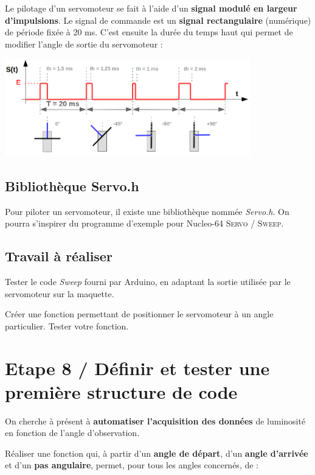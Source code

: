 \documentclass[a4paper,11pt,titlepage]{article} %
\begin{document}
Le pilotage d'un servomoteur se fait à l'aide d'un \textbf{signal modulé en largeur d'impulsions}. Le signal de commande est un \textbf{signal rectangulaire} (numérique) de période fixée à 20 ms. C'est ensuite la durée du temps haut qui permet de modifier l'angle de sortie du servomoteur :

\begin{center}
	\includegraphics[width=0.8\textwidth]{images/MINE_Nucleo_servomoteur.png}
\end{center}

\subsection{Bibliothèque Servo.h}

Pour piloter un servomoteur, il existe une bibliothèque nommée \textsl{Servo.h}. On pourra s'inspirer du programme d'exemple pour Nucleo-64 \textsc{Servo / Sweep}.


\subsection{Travail à réaliser}

\Manip Tester le code \textsl{Sweep} fourni par Arduino, en adaptant la sortie utilisée par le servomoteur sur la maquette.

\Manip Créer une fonction permettant de positionner le servomoteur à un angle particulier. Tester votre fonction. 


\section{Etape 8 / Définir et tester une première structure de code}

On cherche à présent à \textbf{automatiser l'acquisition des données} de luminosité en fonction de l'angle d'observation.

\Manip Réaliser une fonction qui, à partir d'un \textbf{angle de départ}, d'un \textbf{angle d'arrivée} et d'un \textbf{pas angulaire}, permet, pour tous les angles concernés, de :
\end{document}
